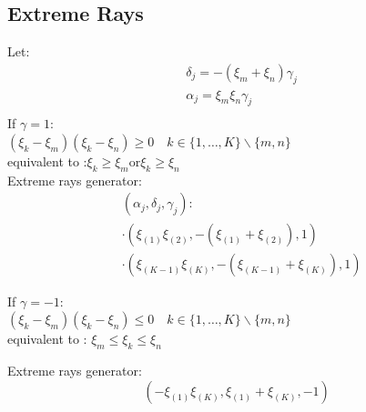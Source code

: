 \documentclass{beamer}
\begin{document}
		\subsection{Extreme Rays}
		\begin{frame} Let:
			\begin{equation}
				\begin{aligned}
				& \delta_j= -(\xi_m+\xi_n)\gamma_j \\
				& \alpha_j=\xi_m\xi_n\gamma_j\\
				\end{aligned}
			\end{equation}
If $\gamma=1$:\\
\quad$(\xi_k - \xi_m)(\xi_k-\xi_n)\geq0 \quad k \in\{1, \ldots, K\} \backslash\{m, n\}$\\
\quad equivalent to :$\xi_k\geq\xi_m \text{or} \xi_k\geq\xi_n$\\
Extreme rays generator:
\begin{equation}
	\begin{aligned}
	& \left(\alpha_j, \delta_j, \gamma_j\right): \\
	& \cdot\left(\xi_{(1)} \xi_{(2)},-\left(\xi_{(1)}+\xi_{(2)}\right), 1\right) \\
	& \cdot\left(\xi_{(K-1)} \xi_{(K)},-\left(\xi_{(K-1)}+\xi_{(K)}\right), 1\right)
	\end{aligned}
\end{equation}


If $\gamma=-1$:\\
\quad$(\xi_k - \xi_m)(\xi_k-\xi_n)\leq0 \quad k \in\{1, \ldots, K\} \backslash\{m, n\}$\\
\quad equivalent to : $\xi_m\leq\xi_k\leq\xi_n$

Extreme rays generator:\\
\begin{equation}
	\left(-\xi_{(1)} \xi_{(K)}, \xi_{(1)}+\xi_{(K)},-1\right)
	\end{equation}
			\end{frame}	
\end{document}

